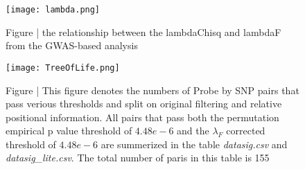 \documentclass[paper=a4, fontsize=11pt]{scrartcl}         %
\numberwithin{equation}{section}                  %
\numberwithin{figure}{section}                    %
\numberwithin{table}{section}                   %
\begin{document}
\begin{figure}[H]
\centering
\texttt{[image: lambda.png]}
\caption*{Figure | the relationship between the lambdaChisq and lambdaF from the GWAS-based analysis}
\end{figure}

\begin{landscape}


\begin{figure}[H]
\centering
\texttt{[image: TreeOfLife.png]}
\caption*{Figure | This figure denotes the numbers of Probe by SNP pairs that pass verious thresholds and split on original filtering and relative positional information. All pairs that pass both the permutation empirical p value threshold of $4.48e-6$ and the $\lambda_F$ corrected threshold of $4.48e-6$ are summerized in the table \emph{datasig.csv} and \emph{datasig\_lite.csv}. The total number of paris in this table is 155}
\end{figure}



\newpage



\end{landscape}
\end{document}
